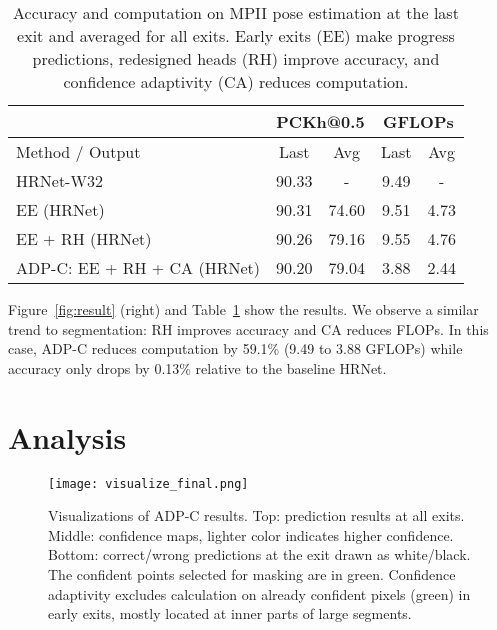 \setlength{\tabcolsep}{4pt}
\renewcommand{\arraystretch}{1.2}
\begin{table}[h]
\centering
\small
\vspace{-1ex}
\begin{tabular}{l|cc|cc}
\hline
                        & \multicolumn{2}{c|}{PCKh@0.5} & \multicolumn{2}{c}{GFLOPs} \\ \hline
Method / Output         & Last                & Avg                & Last                & Avg                \\ \hline
HRNet-W32 \cite{wang2020deep}     & 90.33               & -                  & 9.49                & -                  \\ \hline
EE (HRNet)          & 90.31               & 74.60               & 9.51                & 4.73               \\ \hline
EE + RH (HRNet)    & 90.26               & 79.16              & 9.55                & 4.76               \\
ADP-C: EE + RH + CA (HRNet) & 90.20               & 79.04              & 3.88                & 2.44               \\ \hline
\end{tabular}
\caption{%
Accuracy and computation on MPII pose estimation at the last exit and averaged for all exits.
Early exits (EE) make progress predictions, redesigned heads (RH) improve accuracy, and confidence adaptivity (CA) reduces computation.
}
\label{tab:pose}
\end{table}
 
Figure~\ref{fig:result} (right) and Table~\ref{tab:pose} show the results.
We observe a similar trend to segmentation: RH improves accuracy and CA reduces FLOPs.
In this case, ADP-C reduces computation by 59.1\% (9.49 to 3.88 GFLOPs) while accuracy only drops by 0.13\% relative to the baseline HRNet. 


\section{Analysis}
\label{sec:analysis}


\begin{figure}[!htbp]
\texttt{[image: visualize\_final.png]}
\caption{%
Visualizations of ADP-C results.
Top: prediction results at all exits.
Middle: confidence maps, lighter color indicates higher confidence.
Bottom: correct/wrong predictions at the exit drawn as white/black.
The confident points selected for masking are in green.
Confidence adaptivity excludes calculation on already confident pixels (green) in early exits, mostly located at inner parts of large segments.}
\label{fig:vis}
\end{figure}


